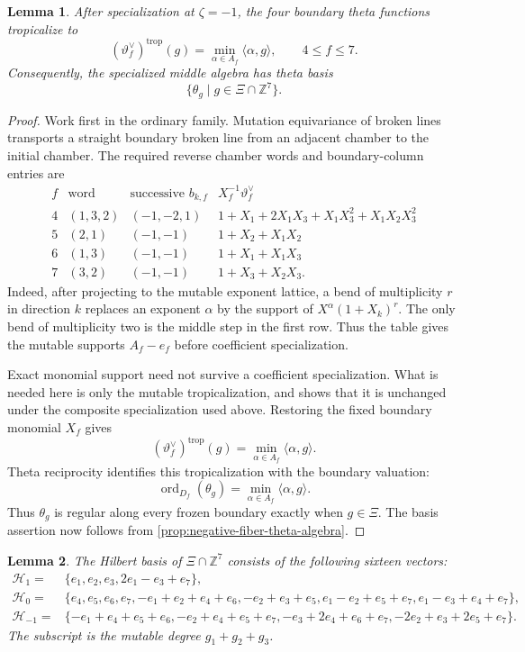 \documentclass[11pt,reqno]{amsart}
\numberwithin{equation}{section}
\newtheorem{lemma}[lemma]{Lemma}
\theoremstyle{remark}
\newcommand{\ZZ}{\mathbb{Z}}
\newcommand{\ord}{\operatorname{ord}}
\begin{document}
\begin{lemma}\label{lem:boundary-support-computation}
After specialization at $\zeta=-1$, the four boundary theta functions tropicalize to
\[ (\vartheta_f^\vee)^{\mathrm{trop}}(g) =\min_{\alpha\in A_f}\langle\alpha,g\rangle, \qquad 4\le f\le7. \]
Consequently, the specialized middle algebra has theta basis
\[ \{\theta_g\mid g\in\Xi\cap\ZZ^7\}. \]
\end{lemma}

\begin{proof}
Work first in the ordinary family.  Mutation equivariance of broken lines
\cite[Proposition~3.6]{GHKK} transports a straight boundary broken line from
an adjacent chamber to the initial chamber.  The required reverse chamber
words and boundary-column entries are
\[
\begin{array}{c|c|c|l}
 f&\text{word}&\text{successive }b_{k,f}
 &X_f^{-1}\vartheta_f^\vee\\ \hline
 4&(1,3,2)&(-1,-2,1)
  &1+X_1+2X_1X_3+X_1X_3^2+X_1X_2X_3^2\\
 5&(2,1)&(-1,-1)&1+X_2+X_1X_2\\
 6&(1,3)&(-1,-1)&1+X_1+X_1X_3\\
 7&(3,2)&(-1,-1)&1+X_3+X_2X_3.
\end{array}
\]
Indeed, after projecting to the mutable exponent lattice, a bend of
multiplicity $r$ in direction $k$ replaces an exponent $\alpha$ by
the support of $X^\alpha(1+X_k)^r$.  The only bend of multiplicity two is
the middle step in the first row.  Thus the table gives the mutable supports
$A_f-e_f$ before coefficient specialization.

Exact monomial support need not survive a coefficient specialization.  What
is needed here is only the mutable tropicalization, and
\cite[Theorem~3.10]{CMMM} shows that it is unchanged under the
composite specialization used above.  Restoring the fixed boundary monomial
$X_f$ gives
\[ (\vartheta_f^\vee)^{\mathrm{trop}}(g) =\min_{\alpha\in A_f}\langle\alpha,g\rangle. \]
Theta reciprocity \cite[Theorem~5.19]{CMMM} identifies this tropicalization
with the boundary valuation:
\[ \ord_{D_f}(\theta_g) =\min_{\alpha\in A_f}\langle\alpha,g\rangle. \]
Thus $\theta_g$ is regular along every frozen boundary exactly when
$g\in\Xi$.  The basis assertion now follows from
\cref{prop:negative-fiber-theta-algebra}.
\end{proof}

\begin{lemma}
\label{lem:Xi-Hilbert-basis}
The Hilbert basis of $\Xi\cap\ZZ^7$ consists of the following sixteen
vectors:
\begin{equation}
\label{eq:Xi-Hilbert-basis}
 \begin{aligned}
 \mathcal H_1={}&\{e_1,e_2,e_3,2e_1-e_3+e_7\},\\
 \mathcal H_0={}&\{e_4,e_5,e_6,e_7,
 -e_1+e_2+e_4+e_6,
 -e_2+e_3+e_5, e_1-e_2+e_5+e_7,
 e_1-e_3+e_4+e_7\},\\
 \mathcal H_{-1}={}&\{-e_1+e_4+e_5+e_6,
 -e_2+e_4+e_5+e_7, -e_3+2e_4+e_6+e_7,
 -2e_2+e_3+2e_5+e_7\}.
 \end{aligned}
\end{equation}
The subscript is the mutable degree $g_1+g_2+g_3$.
\end{lemma}
\end{document}
